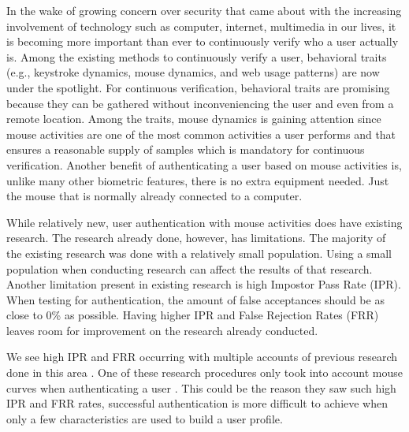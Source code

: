 \documentclass[conference]{IEEEtran}
\begin{document}
In the wake of growing concern over security that came about with the increasing involvement of technology such as computer, internet, multimedia in our lives, it is becoming more important than ever to continuously verify who a user actually is. Among the existing methods to continuously verify a user, behavioral traits (e.g., keystroke dynamics,  mouse dynamics, and web usage patterns) are now under the spotlight. For continuous verification, behavioral traits are promising because they can be gathered without inconveniencing the user and even from a remote location. Among the traits, mouse dynamics is gaining attention since mouse activities are one of the most common activities a user performs and that ensures a reasonable supply of samples which is mandatory for continuous verification. Another benefit of authenticating a user based on mouse activities is, unlike many other biometric features, there is no extra equipment needed. Just the mouse that is normally already connected to a computer.

While relatively new, user authentication with mouse activities does have existing research. The research already done, however, has limitations. The majority of the existing research was done with a relatively small population. Using a small population when conducting research can affect the results of that research. Another limitation present in existing research is high Impostor Pass Rate (IPR). When testing for authentication, the amount of false acceptances should be as close to 0\% as possible. Having higher IPR and False Rejection Rates (FRR) leaves room for improvement on the research already conducted. 

We see high IPR and FRR occurring with multiple accounts of previous research done in this area \cite{Jor, CS, Sch}. One of these research procedures only took into account mouse curves when authenticating a user \cite{Sch}. This could be the reason they saw such high IPR and FRR rates, successful authentication is more difficult to achieve when only a few characteristics are used to build a user profile. 
\end{document}
